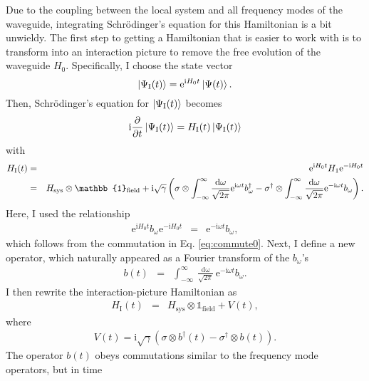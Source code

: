 \documentclass[%
 onecolumn,
 notitlepage,
 longbibliography,
 amsmath,amssymb,
 aps,
 pra,
 10pt,
]{revtex4-1}
\begin{document}
Due to the coupling between the local system and all frequency modes of the waveguide, integrating Schr\"{o}dinger's equation for this Hamiltonian is a bit unwieldy. The first step to getting a Hamiltonian that is easier to work with is to transform into an interaction picture to remove the free evolution of the waveguide $H_0$. Specifically, I choose the state vector
\begin{equation}
\ket{\Psi_\textrm{I}(t)}=\textrm{e}^{\textrm{i}H_{0}t}\ket{\Psi(t)}.
\end{equation}
Then, Schr\"{o}dinger's equation for $\ket{\Psi_\textrm{I}(t)}$ becomes
\begin{equation}
\textrm{i}\frac{\partial}{\partial t}\ket{\Psi_\textrm{I}(t)}=H_\textrm{I}(t)\ket{\Psi_\textrm{I}(t)}
\end{equation}
with
\begin{eqnarray}
H_\textrm{I}(t)&=&\textrm{e}^{\textrm{\scriptsize i}H_{0}t}  H_1\textrm{e}^{-\textrm{\scriptsize i}H_{0} t}\\
&=&H_\text{sys}\otimes\mathbb{1}_\text{field} + \textrm{i}\sqrt{\gamma}\left(\sigma \otimes \int_{-\infty}^{\infty} \frac{\mathop{\textrm{d}\omega}}{\sqrt{2\pi}}\textrm{e}^{\textrm{i}\omega t} b_\omega^\dagger -\sigma^\dagger \otimes \int_{-\infty}^{\infty} \frac{\mathop{\textrm{d}\omega}}{\sqrt{2\pi}}\textrm{e}^{-\textrm{i}\omega t} b_\omega \right).
\end{eqnarray}
Here, I used the relationship
\begin{eqnarray}
\textrm{e}^{\textrm{i}H_{0}t} b_\omega \textrm{e}^{-\textrm{i}H_{0}t}&=&\textrm{e}^{-\textrm{i}\omega t}b_\omega,
\end{eqnarray}
which follows from the commutation in Eq. \ref{eq:commute0}. Next, I define a new operator, which naturally appeared as a Fourier transform of the $b_\omega$'s
\begin{eqnarray}
b(t) &=& \int_{-\infty}^{\infty} \frac{\mathop{\textrm{d}\omega}}{\sqrt{2\pi}}\textrm{e}^{-\textrm{i}\omega t} b_\omega.
\end{eqnarray}
I then rewrite the interaction-picture Hamiltonian as
\begin{eqnarray}
H_\textrm{I}(t)&=&H_\text{sys}\otimes\mathbb{1}_\text{field} + V(t),\label{eq:HI_t}
\end{eqnarray}
where
\begin{eqnarray}
V(t)=\textrm{i}\sqrt{\gamma}\left(\sigma \otimes b^\dagger(t) -\sigma^\dagger \otimes b(t) \right).\label{eq:Vt}
\end{eqnarray}
The operator $b(t)$ obeys commutations similar to the frequency mode operators, but in time
\end{document}
